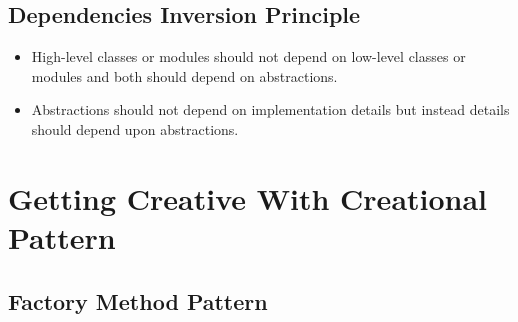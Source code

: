 \subsection{Dependencies Inversion Principle}
\begin{itemize}
  \item High-level classes or modules should not depend on low-level classes or modules and both should depend on abstractions.
  \item Abstractions should not depend on implementation details but instead details should depend upon abstractions.
\end{itemize}


\section{Getting Creative With Creational Pattern}

\subsection{Factory Method Pattern}





